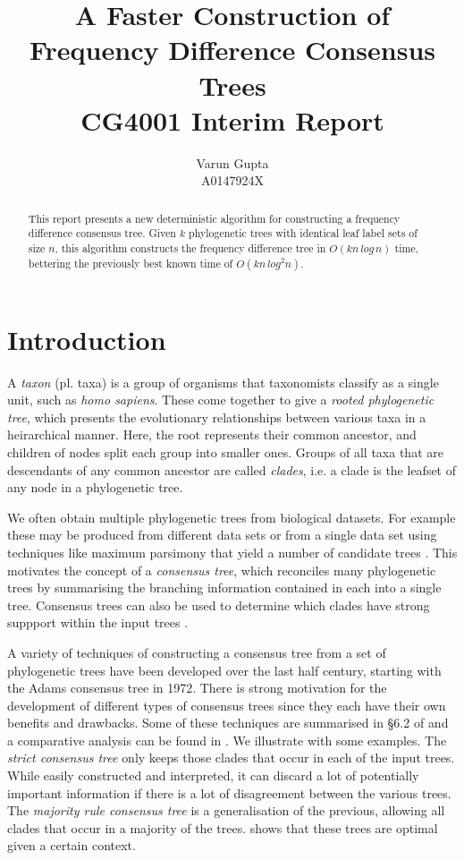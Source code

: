 \documentclass{article}
\title{A Faster Construction of Frequency Difference Consensus Trees\\CG4001 Interim Report}
\author{Varun Gupta\\A0147924X}
\begin{document}
    \maketitle

    \begin{abstract}
        This report presents a new deterministic algorithm for constructing a frequency difference consensus tree. Given $k$ phylogenetic trees with identical leaf label sets of size $n$, this algorithm constructs the frequency difference tree in $O(kn\,log\,n)$ time, bettering the previously best known time of $O(kn\,log^2n)$.
    \end{abstract}

    \section{Introduction}
    \label{sec:introduction}

    A \textit{taxon} (pl. taxa) is a group of organisms that taxonomists classify as a single unit, such as \textit{homo sapiens}. These come together to give a \textit{rooted phylogenetic tree}, which presents the evolutionary relationships between various taxa in a heirarchical manner. Here, the root represents their common ancestor, and children of nodes split each group into smaller ones. Groups of all taxa that are descendants of any common ancestor are called \textit{clades}, i.e. a clade is the leafset of any node in a phylogenetic tree.

    We often obtain multiple phylogenetic trees from biological datasets. For example these may be produced from different data sets or from a single data set using techniques like maximum parsimony that yield a number of candidate trees \cite{bryant1997hunting}. This motivates the concept of a \textit{consensus tree}, which reconciles many phylogenetic trees by summarising the branching information contained in each into a single tree. Consensus trees can also be used to determine which clades have strong suppport within the input trees \cite{felsenstein2004inferring}.

    A variety of techniques of constructing a consensus tree from a set of phylogenetic trees have been developed over the last half century, starting with the Adams consensus tree \cite{adams1972consensus} in 1972. There is strong motivation for the development of different types of consensus trees since they each have their own benefits and drawbacks. Some of these techniques are summarised in \S 6.2 of \cite{bryant1997hunting} and a comparative analysis can be found in \cite{bryant2003classification}. We illustrate with some examples. The \textit{strict consensus tree} \cite{sokal1981taxonomic} only keeps those clades that occur in each of the input trees. While easily constructed and interpreted, it can discard a lot of potentially important information if there is a lot of disagreement between the various trees. The \textit{majority rule consensus tree} \cite{margush1981consensusn} is a generalisation of the previous, allowing all clades that occur in a majority of the trees. \cite{holder2008justification} shows that these trees are optimal given a certain context.
\end{document}
